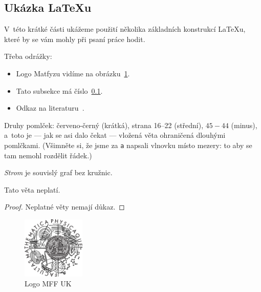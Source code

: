 
\subsection{Ukázka \LaTeX{}u}
\label{ssec:ukazka}

V~této krátké části ukážeme použití několika základních konstrukcí \LaTeX{}u,
které by se vám mohly při psaní práce hodit.

Třeba odrážky:

\begin{itemize}
\item Logo Matfyzu vidíme na obrázku~\ref{fig:mff}.
\item Tato subsekce má číslo~\ref{ssec:ukazka}.
\item Odkaz na literaturu~\cite{lamport94}.
\end{itemize}

Druhy pomlček:
červeno-černý (krátká),
strana 16--22 (střední),
$45-44$ (minus),
a~toto je --- jak se asi dalo čekat --- vložená věta ohraničená dlouhými pomlčkami.
(Všimněte si, že jsme za \verb|a| napsali vlnovku místo mezery: to aby se
tam nemohl rozdělit řádek.)



\begin{define}
{\sl Strom} je souvislý graf bez kružnic.
\end{define}

\begin{theorem}
Tato věta neplatí.
\end{theorem}

\begin{proof}
Neplatné věty nemají důkaz.
\end{proof}

\begin{figure}
	\centering
	\includegraphics[width=30mm]{./img/logo.eps}
	\caption{Logo MFF UK}
	\label{fig:mff}
\end{figure}
